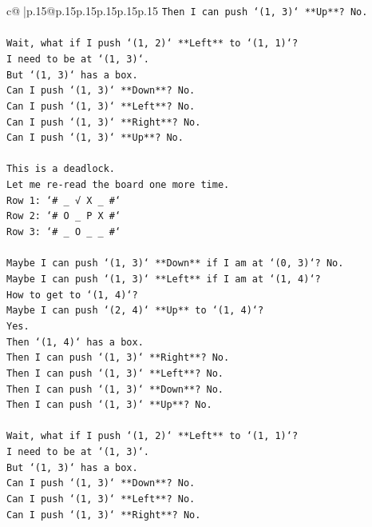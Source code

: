 \documentclass{article}
\begin{document}
{\begin{supertabular}{c@{$\;$}|p{.15\linewidth}@{}p{.15\linewidth}p{.15\linewidth}p{.15\linewidth}p{.15\linewidth}p{.15\linewidth}}
{{{\texttt{Then I can push `(1, 3)` **Up**? No.} \\
\\ 
\texttt{Wait, what if I push `(1, 2)` **Left** to `(1, 1)`?} \\
\texttt{I need to be at `(1, 3)`.} \\
\texttt{But `(1, 3)` has a box.} \\
\texttt{Can I push `(1, 3)` **Down**? No.} \\
\texttt{Can I push `(1, 3)` **Left**? No.} \\
\texttt{Can I push `(1, 3)` **Right**? No.} \\
\texttt{Can I push `(1, 3)` **Up**? No.} \\
\\ 
\texttt{This is a deadlock.} \\
\texttt{Let me re{-}read the board one more time.} \\
\texttt{Row 1: `\# \_ √ X \_ \#`} \\
\texttt{Row 2: `\# O \_ P X \#`} \\
\texttt{Row 3: `\# \_ O \_ \_ \#`} \\
\\ 
\texttt{Maybe I can push `(1, 3)` **Down** if I am at `(0, 3)`? No.} \\
\texttt{Maybe I can push `(1, 3)` **Left** if I am at `(1, 4)`?} \\
\texttt{How to get to `(1, 4)`?} \\
\texttt{Maybe I can push `(2, 4)` **Up** to `(1, 4)`?} \\
\texttt{Yes.} \\
\texttt{Then `(1, 4)` has a box.} \\
\texttt{Then I can push `(1, 3)` **Right**? No.} \\
\texttt{Then I can push `(1, 3)` **Left**? No.} \\
\texttt{Then I can push `(1, 3)` **Down**? No.} \\
\texttt{Then I can push `(1, 3)` **Up**? No.} \\
\\ 
\texttt{Wait, what if I push `(1, 2)` **Left** to `(1, 1)`?} \\
\texttt{I need to be at `(1, 3)`.} \\
\texttt{But `(1, 3)` has a box.} \\
\texttt{Can I push `(1, 3)` **Down**? No.} \\
\texttt{Can I push `(1, 3)` **Left**? No.} \\
\texttt{Can I push `(1, 3)` **Right**? No.} \\
}}}
\end{supertabular}}
\end{document}
